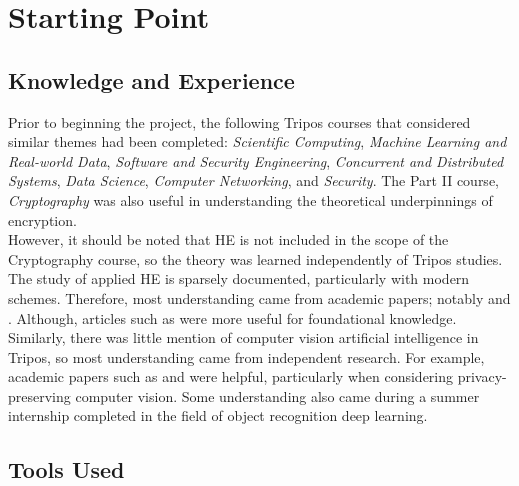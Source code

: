 \setlength{\leftskip}{0cm}





\section{Starting Point}
\label{sec:startingPoint}

\subsection{Knowledge and Experience}
\setlength{\leftskip}{0.5cm}
\indent \indent
Prior to beginning the project, the following Tripos courses that considered similar themes had been completed: \textit{Scientific Computing}, \textit{Machine Learning and Real-world Data}, \textit{Software and Security Engineering}, \textit{Concurrent and Distributed Systems}, \textit{Data Science}, \textit{Computer Networking}, and \textit{Security}. The Part II course, \textit{Cryptography} was also useful in understanding the theoretical underpinnings of encryption.
\smallskip \\ \indent
However, it should be noted that HE is not included in the scope of the Cryptography course, so the theory was learned independently of Tripos studies. The study of applied HE is sparsely documented, particularly with modern schemes. Therefore, most understanding came from academic papers; notably \cite{CKKS} and \cite{SEAL}. Although, articles such as \cite{BrilliantHE} were more useful for foundational knowledge.
\smallskip \\ \indent
Similarly, there was little mention of computer vision artificial intelligence in Tripos, so most understanding came from independent research. For example, academic papers such as \cite{Stauffer} and \cite{Kulchandani} were helpful, particularly when considering privacy-preserving computer vision. Some understanding also came during a summer internship completed in the field of object recognition deep learning.

\setlength{\leftskip}{0cm}

\subsection{Tools Used}
